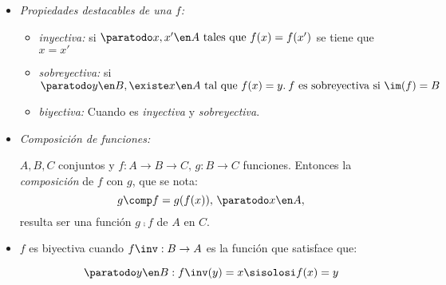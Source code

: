 \begin{itemize}[label={\tiny{}}]
\begin{itemize}[label=\tiny{}]
\begin{itemize}[label=\tiny{}]
                  \item \textit{Propiedades destacables de una $f$:}
                        \begin{itemize}[label=\tiny{}]
                          \item \textit{inyectiva:} si $\paratodo x, x' \en A \text{ tales que } f(x) = f(x')$ se tiene que $ x = x'$
                          \item \textit{sobreyectiva:} si $\paratodo y \en B, \existe x \en A \text{ tal que } f(x) = y.\: f\text{ es sobreyectiva si } \im(f) = B$
                          \item \textit{biyectiva:} Cuando es \textit{inyectiva} y \textit{sobreyectiva}.
                        \end{itemize}

                  \item \textit{Composición de funciones:}\par
                        $A, B, C$ conjuntos y $f: A \to B \to C,\, g: B \to C$ funciones. Entonces la \textit{composición} de $f$ con $g$, que se nota:
                        $$
                          g \comp f = g(f(x)),\, \paratodo x \en A,
                        $$
                        resulta ser una función $g \comp f$ de $A$ en $C$.

                  \item $f$ es biyectiva cuando $f\inv : B \to A$ es la función que satisface que:\par
                        $$
                          \paratodo y \en B: f\inv(y) = x \sisolosi f(x) = y
                        $$
                \end{itemize}
        \end{itemize}
\end{itemize}

